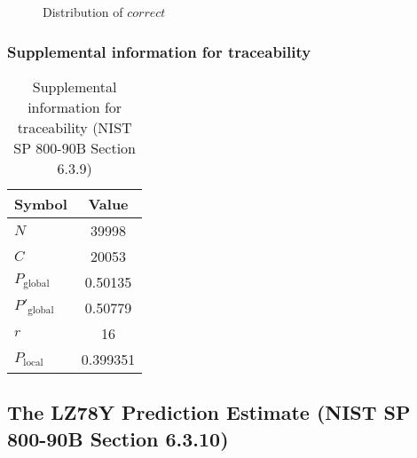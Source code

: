 \documentclass[a3paper,xelatex,english]{bxjsarticle}
\begin{document}
\begin{figure}[htbp]
\centering

\caption{Distribution of $correct$}
\end{figure}
\subsubsection{Supplemental information for traceability}
\renewcommand{\arraystretch}{1.8}
\begin{table}[h]
\caption{Supplemental information for traceability (NIST SP 800-90B Section 6.3.9)}
\begin{center}
\begin{tabular}{|l|c|}
\hline 
\rowcolor{anotherlightblue} %
Symbol				& Value \\ \hline 
$N$				& 39998\\ \hline 
$C$				& 20053\\ \hline 
$P_{\textrm{global}}$				&  0.50135\\ \hline 
$P'_{\textrm{global}}$			&  0.50779\\ \hline 
$r$				& 16\\ \hline 
$P_{\textrm{local}}$ 			& 0.399351\\ \hline
\end{tabular}
\end{center}
\end{table}
\renewcommand{\arraystretch}{1.4}
\clearpage
\subsection{The LZ78Y Prediction Estimate (NIST SP 800-90B Section 6.3.10)}\label{sec:Binary6310}
\end{document}
